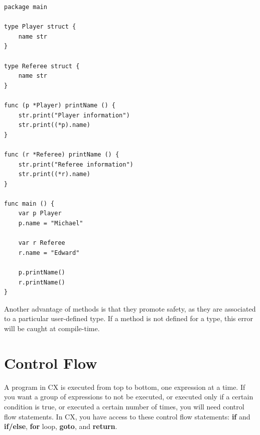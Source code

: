 \documentclass[11pt,fleqn,openany]{book} %
\begin{document}
\begin{lstlisting}[caption={Methods example},captionpos=b,label={listing:methods-example}]
package main

type Player struct {
	name str
}

type Referee struct {
	name str
}

func (p *Player) printName () {
	str.print("Player information")
	str.print((*p).name)
}

func (r *Referee) printName () {
	str.print("Referee information")
	str.print((*r).name)
}

func main () {
	var p Player
	p.name = "Michael"
    
    var r Referee
    r.name = "Edward"

	p.printName()
    r.printName()
}
\end{lstlisting}

Another advantage of methods is that they promote safety, as they are associated to a particular user-defined type. If a method is not defined for a type, this error will be caught at compile-time.



\chapter{Control Flow}
\label{chapter:control-flow}


A program in CX is executed from top to bottom, one expression at a time. If you want a group of expressions to not be executed, or executed only if a certain condition is true, or executed a certain number of times, you will need control flow statements. In CX, you have access to these control flow statements: \textbf{if} and \textbf{if/else}, \textbf{for} loop, \textbf{goto}, and \textbf{return}.
\end{document}
